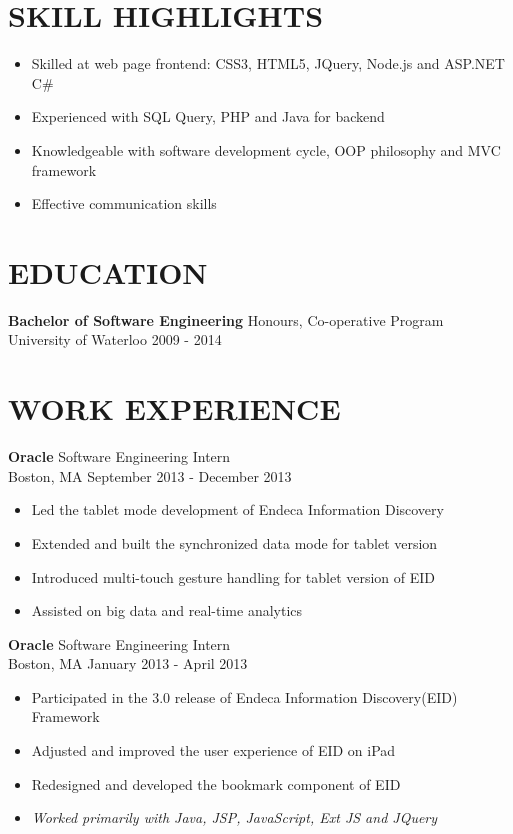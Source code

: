 \begin{resume}  

\section{\uppercase{skill highlights}}
\begin{itemize}
\item Skilled at web page frontend: CSS3, HTML5, JQuery, Node.js and ASP.NET C\#
\item Experienced with SQL Query, PHP and Java for backend
\item Knowledgeable with software development cycle, OOP philosophy and MVC framework
\item Effective communication skills
\end{itemize}

\section{\uppercase{Education}}
{\bf Bachelor of Software Engineering} \hfill Honours, Co-operative Program \\
University of Waterloo \hfill 2009 - 2014

\section{\uppercase{work Experience}}
{\bf Oracle} \hfill Software Engineering Intern \\
Boston, MA \hfill September 2013 - December 2013
\begin{itemize}
\item Led the tablet mode development of Endeca Information Discovery
\item Extended and built the synchronized data mode for tablet version
\item Introduced multi-touch gesture handling for tablet version of EID
\item Assisted on big data and real-time analytics
\end{itemize} 
 
{\bf Oracle} \hfill  Software Engineering Intern \\
Boston, MA \hfill January 2013 - April 2013
\begin{itemize}
\item Participated in the 3.0 release of Endeca Information Discovery(EID) Framework
\item Adjusted and improved the user experience of EID on iPad 
\item Redesigned and developed the bookmark component of EID
\item {\it Worked primarily with Java, JSP, JavaScript, Ext JS and JQuery}
\end{itemize}


\end{resume}
